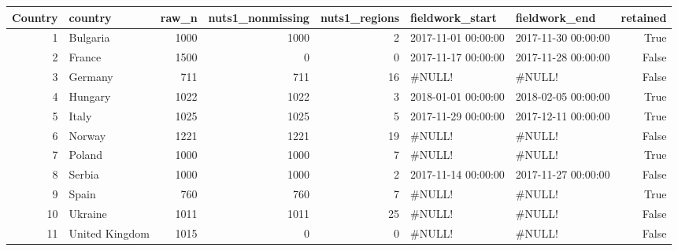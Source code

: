 \begin{tabular}{rlrrrllr}
\toprule
Country & country & raw_n & nuts1_nonmissing & nuts1_regions & fieldwork_start & fieldwork_end & retained \\
\midrule
1 & Bulgaria & 1000 & 1000 & 2 & 2017-11-01 00:00:00 & 2017-11-30 00:00:00 & True \\
2 & France & 1500 & 0 & 0 & 2017-11-17 00:00:00 & 2017-11-28 00:00:00 & False \\
3 & Germany & 711 & 711 & 16 & #NULL! & #NULL! & False \\
4 & Hungary & 1022 & 1022 & 3 & 2018-01-01 00:00:00 & 2018-02-05 00:00:00 & True \\
5 & Italy & 1025 & 1025 & 5 & 2017-11-29 00:00:00 & 2017-12-11 00:00:00 & True \\
6 & Norway & 1221 & 1221 & 19 & #NULL! & #NULL! & False \\
7 & Poland & 1000 & 1000 & 7 & #NULL! & #NULL! & True \\
8 & Serbia & 1000 & 1000 & 2 & 2017-11-14 00:00:00 & 2017-11-27 00:00:00 & False \\
9 & Spain & 760 & 760 & 7 & #NULL! & #NULL! & True \\
10 & Ukraine & 1011 & 1011 & 25 & #NULL! & #NULL! & False \\
11 & United Kingdom & 1015 & 0 & 0 & #NULL! & #NULL! & False \\
\bottomrule
\end{tabular}
